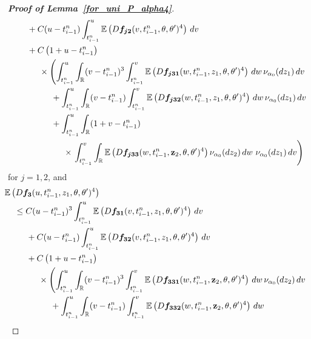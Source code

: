 \documentclass[11pt,a4paper]{article}
\newcommand{\alphan}{{\alpha_0}}
\newcommand{\tminus}{{t_{i-1}^n}}
\newcommand{\EE}{{\mathbb E}}
\newcommand{\RR}{{\mathbb R}}
\numberwithin{equation}{section}
\numberwithin{theorem}{section}
\begin{document}
\begin{proof}[\textbf{Proof of Lemma~\ref{for_uni_P_alpha4}}]
\begin{align}
\begin{split}
&\hspace{5mm} +  C({u}-\tminus) \int_\tminus^{u} \EE\left( D\bm{f_{j2}}({v},\tminus,
  \theta,\theta')^4\right)\, d{v}\\
&\hspace{5mm} + C\left( 1+ {u}-\tminus\right) \\
&\hspace{10mm} \times \left(\int_\tminus^{u} \int_\RR
  ({v}-\tminus)^3 \int_\tminus^{v} \EE\left(
  D\bm{f_{j31}}({w},\tminus,z_1, \theta,\theta')^4 \right)\,d{w}\,\nu_\alphan(dz_1)\, d{v}\right.\\
&\hspace{15mm} + \int_\tminus^{u} \int_\RR 
({v}-\tminus) \int_\tminus^{v} \EE\left(
  D\bm{f_{j32}}({w},\tminus,z_1, \theta,\theta')^4 \right)\,d{w}
\,\nu_\alphan(dz_1)\, d{v}\\
&\hspace{15mm} + \int_\tminus^{u} \int_\RR
  (1+{v}-\tminus) \\
&\hspace{20mm} \times \left.\int_\tminus^{v} \int_\RR
\EE\left( D\bm{f_{j33}}({w},\tminus,\mathbf{z}_2,
  \theta,\theta')^4\right) \nu_\alphan(dz_2)\, d{w}\,
 \,\nu_\alphan(dz_1)\, d{v}\right)
\end{split}
\end{align}
%
for $j=1,2$, and
\begin{align}
\begin{split}\label{second_part_alpha4}
&\hspace{-4mm} \EE\left( D\bm{f_3}({u},\tminus,z_1,
  \theta,\theta')^4\right)  \\
&\leq C({u}-\tminus)^3\int_\tminus^{u} \EE\left( D\bm{f_{31}}({v},\tminus,z_1,
  \theta,\theta')^4\right)\, d{v} \\
&\hspace{5mm} +  C({u}-\tminus) \int_\tminus^{u} \EE\left( D\bm{f_{32}}({v},\tminus,z_1,
  \theta,\theta')^4\right)\, d{v}\\
&\hspace{5mm} + C\left( 1+ {u}-\tminus\right) \\
&\hspace{10mm} \times \left( \int_\tminus^{u} \int_\RR
  ({v}-\tminus)^3 \int_\tminus^{v} \EE\left(
  D\bm{f_{331}}({w},\tminus,\mathbf{z}_2, \theta,\theta')^4 \right)\,d{w}\,\nu_\alphan(dz_2)\, d{v}\right.\\
&\hspace{15mm} + \int_\tminus^{u} \int_\RR 
({v}-\tminus) \int_\tminus^{v} \EE\left(
  D\bm{f_{332}}({w},\tminus,\mathbf{z}_2, \theta,\theta')^4 \right)\,d{w}

\end{split}
\end{align}
\end{proof}
\end{document}
